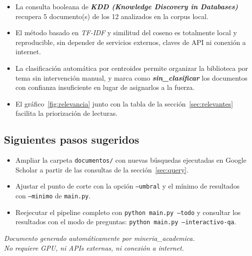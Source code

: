 \documentclass[11pt,a4paper]{article}
\newcommand{\tema}[1]{\textbf{\textit{#1}}}
\begin{document}
\begin{itemize}
\setlength{\itemsep}{4pt}
  \item La consulta booleana de \tema{ KDD (Knowledge Discovery in Databases) } recupera
        5 documento(s) de los 12
        analizados en la corpus local.
  \item El método basado en \textit{TF-IDF} y similitud del coseno es
        totalmente local y reproducible, sin depender de servicios externos,
        claves de API ni conexión a internet.
  \item La clasificación automática por centroides permite organizar la
        biblioteca por tema sin intervención manual, y marca como
        \tema{sin\_clasificar} los documentos con confianza insuficiente en
        lugar de asignarlos a la fuerza.
  \item El gráfico~\ref{fig:relevancia} junto con la tabla de la
        sección~\ref{sec:relevantes} facilita la priorización de lecturas.
\end{itemize}

\subsection*{Siguientes pasos sugeridos}

\begin{itemize}
\setlength{\itemsep}{3pt}
  \item Ampliar la carpeta \texttt{documentos/} con nuevas búsquedas
        ejecutadas en Google Scholar a partir de las consultas de la
        sección~\ref{sec:query}.
  \item Ajustar el punto de corte con la opción \texttt{--umbral} y el mínimo
        de resultados con \texttt{--minimo} de \texttt{main.py}.
  \item Reejecutar el pipeline completo con \texttt{python main.py --todo}
        y consultar los resultados con el modo de preguntas:
        \texttt{python main.py --interactivo-qa}.
\end{itemize}

\vfill
\begin{center}
\small
\textit{Documento generado automáticamente por mineria\_academica.\\
No requiere GPU, ni APIs externas, ni conexión a internet.}
\end{center}
\end{document}
